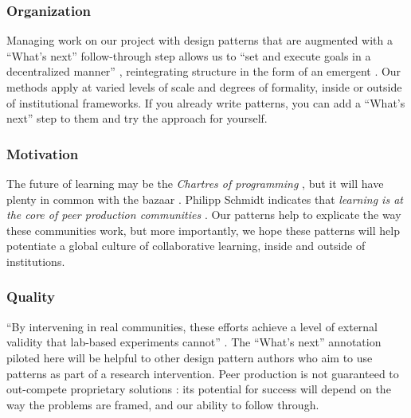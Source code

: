 \endgroup

\vspace{-.25\baselineskip}

\subsubsection*{Organization} 
Managing work on our project with design patterns that are augmented
with a ``What's next'' follow-through step allows us to ``set and execute goals in a decentralized manner'' \cite{benkler2015peer}, reintegrating
structure in the form of an emergent .  Our
methods apply at varied levels of scale and degrees of formality,
inside or outside of institutional frameworks.  If you already write
patterns, you can add a ``What's next'' step to them and try the
approach for yourself.

\vspace{-.25\baselineskip}

\subsubsection*{Motivation}  The future of learning may be
the \emph{Chartres of programming} \cite{alexander1999origins}, but it will have plenty in common with the
bazaar \cite{raymond2001cathedral}.
%
Philipp Schmidt indicates that \emph{learning is at the core of peer
  production communities} \cite{schmidt+commons-based+2009}.  Our
patterns help to explicate the way these communities work, but more
importantly, we hope these patterns will help potentiate a global
culture of collaborative learning, inside and outside of institutions.

\vspace{-.25\baselineskip}

\subsubsection*{Quality} 
``By intervening in real communities, these efforts achieve a level of
external validity that lab-based experiments cannot''
\cite{benkler2015peer}.  The ``What's next'' annotation piloted here
will be helpful to other design pattern authors who aim to use
patterns as part of a research intervention.  Peer production is not guaranteed to
  out-compete proprietary solutions
\cite{benkler2015peer,free-software-better}: its potential for
success will depend on the way the problems are framed,
and our ability to follow through.

